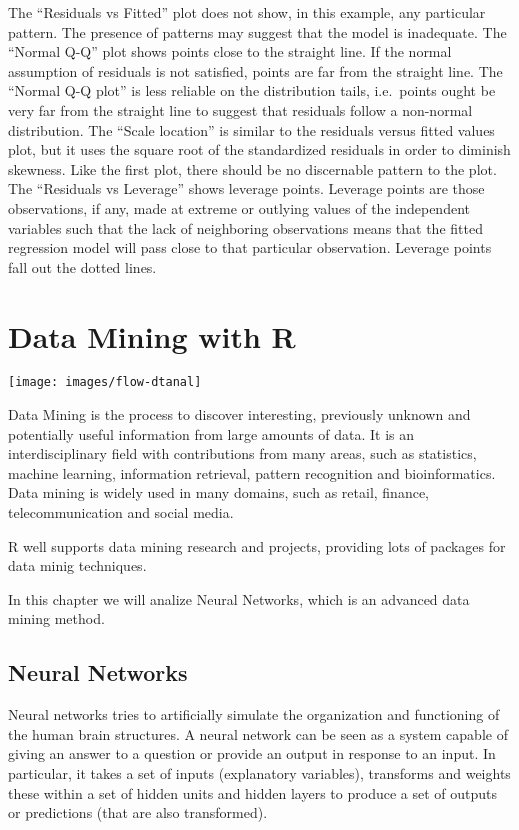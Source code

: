 \documentclass[]{book}
\begin{document}
The ``Residuals vs Fitted'' plot does not show, in this example, any
particular pattern. The presence of patterns may suggest that the model
is inadequate. The ``Normal Q-Q'' plot shows points close to the
straight line. If the normal assumption of residuals is not satisfied,
points are far from the straight line. The ``Normal Q-Q plot'' is less
reliable on the distribution tails, i.e.~points ought be very far from
the straight line to suggest that residuals follow a non-normal
distribution. The ``Scale location'' is similar to the residuals versus
fitted values plot, but it uses the square root of the standardized
residuals in order to diminish skewness. Like the first plot, there
should be no discernable pattern to the plot. The ``Residuals vs
Leverage'' shows leverage points. Leverage points are those
observations, if any, made at extreme or outlying values of the
independent variables such that the lack of neighboring observations
means that the fitted regression model will pass close to that
particular observation. Leverage points fall out the dotted lines.

\chapter{Data Mining with R}\label{data-mining-with-r}

\texttt{[image: images/flow-dtanal]}

Data Mining is the process to discover interesting, previously unknown
and potentially useful information from large amounts of data. It is an
interdisciplinary field with contributions from many areas, such as
statistics, machine learning, information retrieval, pattern recognition
and bioinformatics. Data mining is widely used in many domains, such as
retail, finance, telecommunication and social media.

R well supports data mining research and projects, providing lots of
packages for data minig techniques.

In this chapter we will analize Neural Networks, which is an advanced
data mining method.

\section{Neural Networks}\label{neural-networks}

Neural networks tries to artificially simulate the organization and
functioning of the human brain structures. A neural network can be seen
as a system capable of giving an answer to a question or provide an
output in response to an input. In particular, it takes a set of inputs
(explanatory variables), transforms and weights these within a set of
hidden units and hidden layers to produce a set of outputs or
predictions (that are also transformed).
\end{document}

